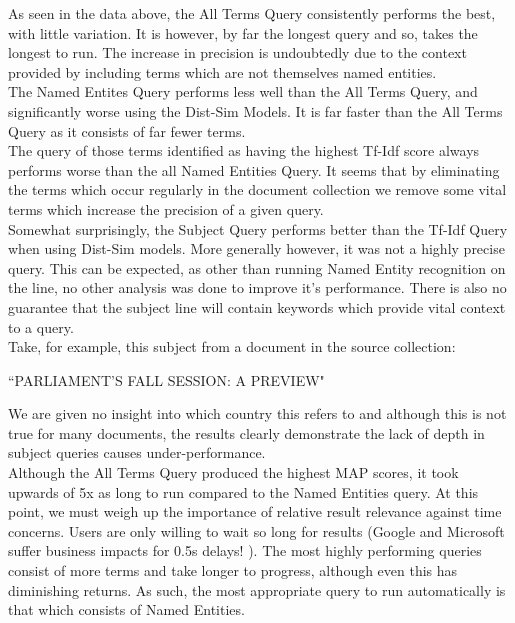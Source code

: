 \documentclass{l4proj}
\begin{document}
As seen in the data above, the All Terms Query consistently performs the best, with little variation. It is however, by far the longest query and so, takes the longest to run. The increase in precision is undoubtedly due to the context provided by including terms which are not themselves named entities. \\
The Named Entites Query performs less well than the All Terms Query, and significantly worse using the Dist-Sim Models. It is far faster than the All Terms Query as it consists of far fewer terms. \\
The query of those terms identified as having the highest Tf-Idf score always performs worse than the all Named Entities Query. It seems that by eliminating the terms which occur regularly in the document collection we remove some vital terms which increase the precision of a given query. \\
Somewhat surprisingly, the Subject Query performs better than the Tf-Idf Query when using Dist-Sim models. More generally however, it was not a highly precise query.  This can be expected, as other than running Named Entity recognition on the line, no other analysis was done to improve it's performance. There is also no guarantee that the subject line will contain keywords which provide vital context to a query.\\
Take, for example, this subject from a document in the source collection:
\begin{center}``PARLIAMENT'S FALL SESSION: A PREVIEW"\end{center}
We are given no insight into which country this refers to and although this is not true for many documents, the results clearly demonstrate the lack of depth in subject queries causes under-performance.\\
Although the All Terms Query produced the highest MAP scores, it took upwards of 5x as long to run compared to the Named Entities query. At this point, we must weigh up the importance of relative result relevance against time concerns. Users are only willing to wait so long for results (Google and Microsoft suffer business impacts for 0.5s delays! \cite{performance}). The most highly performing queries consist of more terms and take longer to progress, although even this has diminishing returns.
As such, the most appropriate query to run automatically is that which consists of Named Entities.
\end{document}
